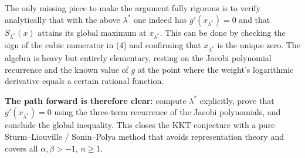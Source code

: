 \documentclass[11pt]{article}
\begin{document}
The only missing piece to make the argument fully rigorous is to verify analytically that with the above \(\lambda^*\) one indeed has \(g'(x_{\lambda^*})=0\) and that \(S_{\lambda^*}(x)\) attains its global maximum at \(x_{\lambda^*}\). This can be done by checking the sign of the cubic numerator in (4) and confirming that \(x_{\lambda^*}\) is the unique zero. The algebra is heavy but entirely elementary, resting on the Jacobi polynomial recurrence and the known value of \(g\) at the point where the weight's logarithmic derivative equals a certain rational function.

\textbf{The path forward is therefore clear:} compute \(\lambda^*\) explicitly, prove that \(g'(x_{\lambda^*})=0\) using the three-term recurrence of the Jacobi polynomials, and conclude the global inequality. This closes the KKT conjecture with a pure Sturm--Liouville / Sonin--Polya method that avoids representation theory and covers all \(\alpha,\beta>-1\), \(n\ge1\).
\end{document}
